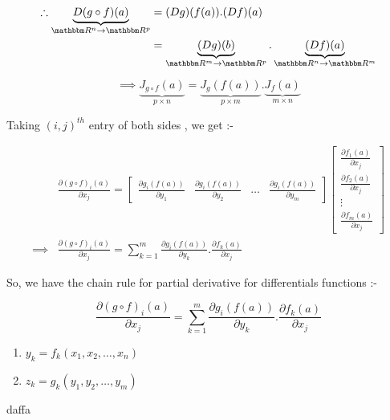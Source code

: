 \documentclass[Analysis-3]{subfiles}
\begin{document}
 \begin{align*}
    \therefore    \underbrace{D(g \circ f)(a)}_{\R^n \to \R^p} &= (Dg)(f(a)).(Df)(a) \\
    &= \underbrace{(Dg)(b)}_{\R^m \to \R^p} . \underbrace{(Df)(a)}_{\R^n \to \R^m}
\end{align*}

\[\implies \underbrace{J_{g \circ f}(a)}_{p \times n} = \underbrace{J_{g}(f(a))}_{p \times m} . \underbrace{J_{f}(a)}_{m \times n} \]

Taking $(i,j)^{th}$ entry of both sides , we get :-

\begin{align*}
    & \frac{\partial (g \circ f)_{i}(a)}{\partial x_j} = \begin{bmatrix}
        \frac{\partial g_{i}(f(a))}{\partial y_1} & \frac{\partial g_{i}(f(a))}{\partial y_2} & \ldots & \frac{\partial g_{i}(f(a))}{\partial y_m}
    \end{bmatrix} \begin{bmatrix}
        \frac{\partial f_{1}(a)}{\partial x_j} \\
        \frac{\partial f_{2}(a)}{\partial x_j} \\
        \vdots \\
        \frac{\partial f_{m}(a)}{\partial x_j}
    \end{bmatrix} \\
    \implies & \frac{\partial (g \circ f)_{i}(a)}{\partial x_j} = \sum_{k = 1}^{m}   \frac{\partial g_{i}(f(a))}{\partial y_k} . \frac{\partial f_{k}(a)}{\partial x_j}
\end{align*}


So, we have the chain rule for partial derivative for differentials functions :-

\[ \frac{\partial (g \circ f)_{i}(a)}{\partial x_j} = \sum_{k = 1}^{m}   \frac{\partial g_{i}(f(a))}{\partial y_k} . \frac{\partial f_{k}(a)}{\partial x_j} \]


\begin{notnBox}
    \begin{enumerate}
        \item $y_k = f_k \left( x_1 , x_2 , \ldots, x_n \right)$
        \item $z_k = g_k \left( y_1 , y_2, \ldots , y_m \right)$
    \end{enumerate}
\end{notnBox}


daffa
\end{document}
